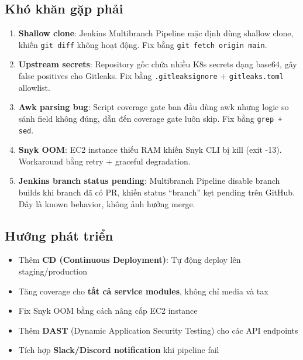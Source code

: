 \subsection{Khó khăn gặp phải}
\begin{enumerate}[noitemsep]
    \item \textbf{Shallow clone}: Jenkins Multibranch Pipeline mặc định dùng shallow clone, khiến \texttt{git diff} không hoạt động. Fix bằng \texttt{git fetch origin main}.
    \item \textbf{Upstream secrets}: Repository gốc chứa nhiều K8s secrets dạng base64, gây false positives cho Gitleaks. Fix bằng \texttt{.gitleaksignore} + \texttt{gitleaks.toml} allowlist.
    \item \textbf{Awk parsing bug}: Script coverage gate ban đầu dùng awk nhưng logic so sánh field không đúng, dẫn đến coverage gate luôn skip. Fix bằng \texttt{grep + sed}.
    \item \textbf{Snyk OOM}: EC2 instance thiếu RAM khiến Snyk CLI bị kill (exit -13). Workaround bằng retry + graceful degradation.
    \item \textbf{Jenkins branch status pending}: Multibranch Pipeline disable branch builds khi branch đã có PR, khiến status ``branch'' kẹt pending trên GitHub. Đây là known behavior, không ảnh hưởng merge.
\end{enumerate}

\subsection{Hướng phát triển}
\begin{itemize}[noitemsep]
    \item Thêm \textbf{CD (Continuous Deployment)}: Tự động deploy lên staging/production
    \item Tăng coverage cho \textbf{tất cả service modules}, không chỉ media và tax
    \item Fix Snyk OOM bằng cách nâng cấp EC2 instance
    \item Thêm \textbf{DAST} (Dynamic Application Security Testing) cho các API endpoints
    \item Tích hợp \textbf{Slack/Discord notification} khi pipeline fail
\end{itemize}
